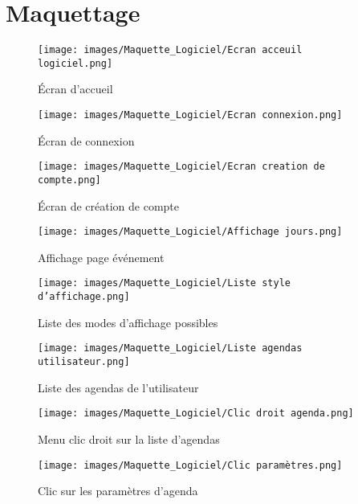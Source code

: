 \documentclass{article}
\begin{document}
\newpage
\section{Maquettage}

\begin{figure}[H]
    \centering
    \texttt{[image: images/Maquette\_Logiciel/Ecran acceuil logiciel.png]}
    \caption{Écran d’accueil}
    \label{fig:21}
\end{figure}

\begin{figure}[H]
    \centering
    \texttt{[image: images/Maquette\_Logiciel/Ecran connexion.png]}
    \caption{Écran de connexion}
    \label{fig:22}
\end{figure}

\begin{figure}[H]
    \centering
    \texttt{[image: images/Maquette\_Logiciel/Ecran creation de compte.png]}
    \caption{Écran de création de compte}
    \label{fig:23}
\end{figure}

\begin{figure}[H]
    \centering
    \texttt{[image: images/Maquette\_Logiciel/Affichage jours.png]}
    \caption{Affichage page événement}
    \label{fig:24}
\end{figure}

\begin{figure}[H]
    \centering
    \texttt{[image: images/Maquette\_Logiciel/Liste style d'affichage.png]}
    \caption{Liste des modes d'affichage possibles}
    \label{fig:25}
\end{figure}

\begin{figure}[H]
    \centering
    \texttt{[image: images/Maquette\_Logiciel/Liste agendas utilisateur.png]}
    \caption{Liste des agendas de l'utilisateur}
    \label{fig:26}
\end{figure}

\begin{figure}[H]
    \centering
    \texttt{[image: images/Maquette\_Logiciel/Clic droit agenda.png]}
    \caption{Menu clic droit sur la liste d'agendas}
    \label{fig:27}
\end{figure}

\begin{figure}[H]
    \centering
    \texttt{[image: images/Maquette\_Logiciel/Clic paramètres.png]}
    \caption{Clic sur les paramètres d'agenda}
    \label{fig:28}
\end{figure}
\end{document}
